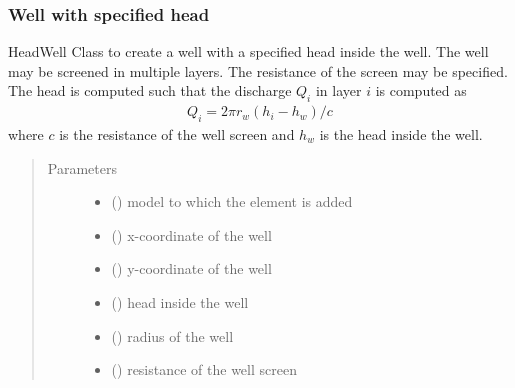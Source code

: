 \documentclass[letterpaper,10pt,english]{sphinxmanual}
\begin{document}
\subsubsection{Well with specified head}
\label{\detokenize{wells/headwell:well-with-specified-head}}\label{\detokenize{wells/headwell::doc}}

\begin{fulllineitems}
\label{\detokenize{wells/headwell:timml.well.HeadWell}}
HeadWell Class to create a well with a specified head inside the well.
The well may be screened in multiple layers. The resistance of the screen
may be specified. The head is computed such that the discharge \(Q_i\)
in layer \(i\) is computed as
\begin{equation*}
\begin{split}Q_i = 2\pi r_w(h_i - h_w)/c\end{split}
\end{equation*}
where \(c\) is the resistance of the well screen and \(h_w\) is
the head inside the well.
\begin{quote}\begin{description}
\item[{Parameters}] \leavevmode\begin{itemize}
\item {} 
 () \textendash{} model to which the element is added

\item {} 
 () \textendash{} x-coordinate of the well

\item {} 
 () \textendash{} y-coordinate of the well

\item {} 
 () \textendash{} head inside the well

\item {} 
 () \textendash{} radius of the well

\item {} 
 () \textendash{} resistance of the well screen


\end{itemize}
\end{description}
\end{quote}
\end{fulllineitems}
\end{document}
